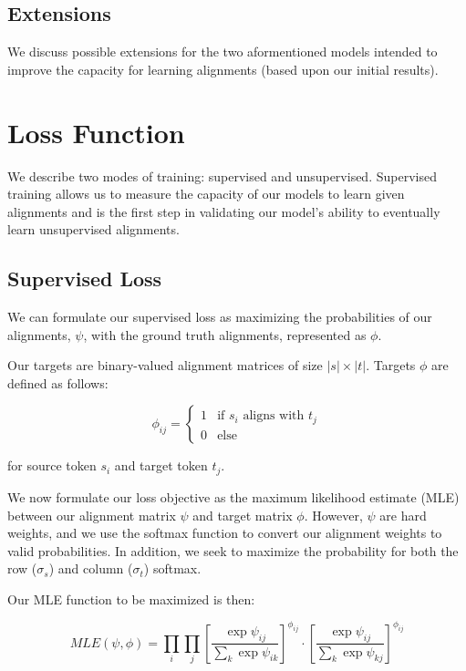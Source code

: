 \documentclass[twoside,twocolumn]{article}
\begin{document}
\subsection{Extensions}
We discuss possible extensions for the two aformentioned models intended to
improve the capacity for learning alignments (based upon our initial results).

\section{Loss Function}
We describe two modes of training: supervised and unsupervised. Supervised
training allows us to measure the capacity of our models to learn given
alignments and is the first step in validating our model's ability to
eventually learn unsupervised alignments.

\subsection{Supervised Loss}
We can formulate our supervised loss as maximizing the probabilities of our
alignments, $\psi$, with the ground truth alignments, represented as $\phi$.

Our targets are binary-valued alignment matrices of size $|s| \times |t|$.
Targets $\phi$ are defined as follows:

\begin{equation}
  \phi_{ij} = \begin{cases}
  1 & \text{if } s_i \text{ aligns with } t_j \\
  0 & \text{else}
  \end{cases}
\end{equation}

\noindent for source token $s_i$ and target token $t_j$.

We now formulate our loss objective as the maximum likelihood estimate (MLE)
between our alignment matrix $\psi$ and target matrix $\phi$. However, $\psi$
are hard weights, and we use the softmax function to convert our alignment
weights to valid probabilities. In addition, we seek to maximize the
probability for both the row ($\sigma_s$) and column ($\sigma_t$) softmax.

Our MLE function to be maximized is then:

\begin{equation}
  MLE(\psi, \phi) = \prod_i \prod_j \left[ \frac{\exp \psi_{ij}}{\sum_k \exp \psi_{ik}} \right]^{\phi_{ij}} \cdot \left[ \frac{\exp \psi_{ij}}{\sum_k \exp \psi_{kj}} \right]^{\phi_{ij}}
\end{equation}
\end{document}
